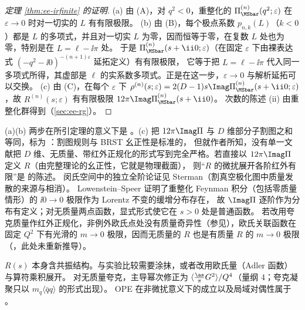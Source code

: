 \begin{proof}[定理 \ref{thm:ee-irfinite} 的证明]
(a) 由 (A)，对 $q^2<0$，重整化的 $\Pi^{(n)}_{\MSbar}(q^2;\varepsilon)$ 在 $\varepsilon\to0$ 时对一切实的 $L$ 有有限极限。
(b) 由 (B)，每个极点系数 $p_{n,k}(L)$（$k<0$）都是 $L$ 的多项式，并且对一切实 $L$ 为零，因而恒等于零，在复数 $L$ 处也为零，特别是在 $L=\ell-\ii\pi$ 处。
于是 $\Pi^{(n)}_{\MSbar}(s+\ii0;\varepsilon)$（在固定 $\varepsilon$ 下由裸表达式 $(-q^2-\ii0)^{-(n+1)\varepsilon}$ 延拓定义）有有限极限，
它等于把 $L=\ell-\ii\pi$ 代入同一多项式所得，其虚部是 $\ell$ 的实系数多项式。正是在这一步，$\varepsilon\to0$ 与解析延拓可以交换。
(c) 由 (C)，在每个 $\varepsilon$ 下 $\rho^{(n)}(s;\varepsilon)=2(D-1)s\Imag\Pi^{(n)}_{\MSbar}(s+\ii0;\varepsilon)$，故 $R^{(n)}(s;\varepsilon)$ 有有限极限 $12\pi\Imag\Pi^{(n)}_{\MSbar}(s+\ii0)$。
次数的陈述 (ii) 由重整化群得到（\cref{sec:ee-rg}）。
\end{proof}

\begin{remark}[严格性的界定]
(a)(b) 两步在所引定理的意义下是 \tagR。(c) 把 $12\pi\Imag\Pi$ 与 $D$ 维部分子割图之和等同，标为 \tagA：割图规则与 BRST 幺正性是标准的，
但就作者所知，没有单一文献把 $D$ 维、无质量、带红外正规化的形式写到完全严格。若直接以 $12\pi\Imag\Pi$ 定义 $R$（由完整理论的幺正性，它就是物理截面），
则“$R$ 的微扰展开各阶红外有限”是 \tagR 的陈述。
闵氏空间中的独立全阶论证见 Sterman\cite{Sterman1976,Sterman1978a,Sterman1978b}（割真空极化图中质量发散的来源与相消）。
Lowenstein--Speer\cite{LowensteinSpeer1976} 证明了重整化 Feynman 积分（包括零质量情形）的 $\ii0\to0$ 极限作为 Lorentz 不变的缓增分布存在，
故 $\Imag\Pi$ 逐阶作为分布有定义；对无质量两点函数，显式形式使它在 $s>0$ 处是普通函数。
若改用夸克质量作红外正规化，非例外欧氏点处没有质量奇异性（参见\cite{Kinoshita1962,KinoshitaUkawa1976}），欧氏关联函数在固定 $Q^2$ 下有光滑的 $m\to0$ 极限，因而无质量的 $R$ 也是有质量 $R$ 的 $m\to0$ 极限（\tagA，此处未重新推导）。
\end{remark}

\begin{remark}[微扰论之外]
$R(s)$ 本身含共振结构。与实验比较需要涂抹\cite{PoggioQuinnWeinberg1976}，或者改用欧氏量（Adler 函数）与算符乘积展开\cite{ShifmanVainshteinZakharov1979a}。
对无质量夸克，主导幂次修正为 $\langle\frac{\as}{\pi}G^2\rangle/Q^4$（量纲 4；夸克凝聚只以 $m_q\langle\bar qq\rangle$ 的形式出现）。
OPE 在非微扰意义下的成立以及局域对偶性属于 \tagC。
\end{remark}

